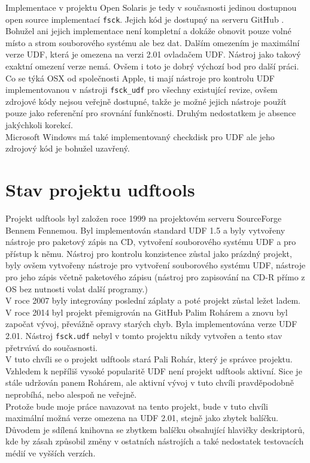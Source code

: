 Implementace v projektu Open Solaris je tedy v současnosti jedinou dostupnou open source implementací \texttt{fsck}. Jejich kód je dostupný na serveru GitHub \cite{solaris-github}. Bohužel ani jejich implementace není kompletní a dokáže obnovit pouze volné místo a strom souborového systému ale bez dat. Dalším omezením je maximální verze UDF, která je omezena na verzi 2.01 ovladačem UDF. Nástroj jako takový exaktní omezení verze nemá. Ovšem i toto je dobrý výchozí bod pro další práci.\\
Co se týká OSX od společnosti Apple, ti mají nástroje pro kontrolu UDF implementovanou v nástroji \texttt{fsck\_udf} pro všechny existující revize, ovšem zdrojové kódy nejsou veřejně dostupné, takže je možné jejich nástroje použít pouze jako referenční pro srovnání funkčnosti. Druhým nedostatkem je absence jakýchkoli korekcí.\\
Microsoft Windows má také implementovaný checkdisk pro UDF ale jeho zdrojový kód je bohužel uzavřený.\\

\section{Stav projektu udftools}
\label{sec:stav-udftools}
Projekt udftools byl založen roce 1999 na projektovém serveru SourceForge \cite{udftools-sourceforge} Bennem Fennemou. Byl implementován standard UDF 1.5 a byly vytvořeny nástroje pro paketový zápis na CD, vytvoření souborového systému UDF a pro přístup k němu. Nástroj pro kontrolu konzistence zůstal jako prázdný projekt, byly ovšem vytvořeny nástroje pro vytvoření souborového systému UDF, nástroje pro jeho zápis včetně paketového zápisu (nástroj pro zapisování na CD-R přímo z OS bez nutnosti volat další programy.)\\
V roce 2007 byly integrovány poslední záplaty a poté projekt zůstal ležet ladem. V roce 2014 byl projekt přemigrován na GitHub \cite{udftools-github} Palim Rohárem a znovu byl započat vývoj, převážně opravy starých chyb. Byla implementována verze UDF 2.01. Nástroj \texttt{fsck.udf} nebyl v tomto projektu nikdy vytvořen a tento stav přetrvává do současnosti.\\
V tuto chvíli se o projekt udftools stará Pali Rohár, který je správce projektu. Vzhledem k nepříliš vysoké popularitě UDF není projekt udftools aktivní. Sice je stále udržován panem Rohárem, ale aktivní vývoj v tuto chvíli pravděpodobně neprobíhá, nebo alespoň ne veřejně.\\
Protože bude moje práce navazovat na tento projekt, bude v tuto chvíli maximální možná verze omezena na UDF 2.01, stejně jako zbytek balíčku. Důvodem je sdílená knihovna se zbytkem balíčku obsahující hlavičky deskriptorů, kde by zásah způsobil změny v ostatních nástrojích a také nedostatek testovacích médií ve vyšších verzích.

